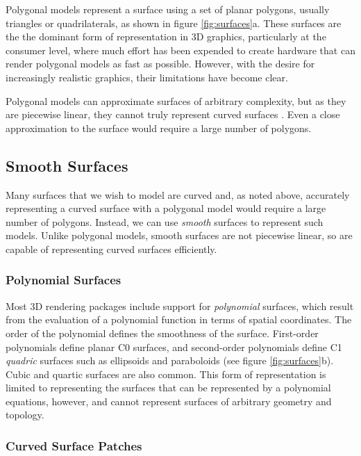 Polygonal models represent a surface using a set of planar polygons, usually triangles or quadrilaterals, as shown in figure \ref{fig:surfaces}a. These surfaces are the the dominant form of representation in 3D graphics, particularly at the consumer level, where much effort has been expended to create hardware that can render polygonal models as fast as possible. However, with the desire for increasingly realistic graphics, their limitations have become clear.

Polygonal models can approximate surfaces of arbitrary complexity, but as they are piecewise linear, they cannot truly represent curved surfaces \cite{Besl94}. Even a close approximation to the surface would require a large number of polygons.

\subsection{\label{sec:litreview:surfaces:smooth}Smooth Surfaces}

Many surfaces that we wish to model are curved and, as noted above, accurately representing a curved surface with a polygonal model would require a large number of polygons. Instead, we can use {\it smooth} surfaces to represent such models. Unlike polygonal models, smooth surfaces are not piecewise linear, so are capable of representing curved surfaces efficiently.

\subsubsection{\label{sec:litreview:surfaces:smooth:polynomial}Polynomial Surfaces}

Most 3D rendering packages include support for {\it polynomial} surfaces, which result from the evaluation of a polynomial function in terms of spatial coordinates. The order of the polynomial defines the smoothness of the surface. First-order polynomials define planar C0 surfaces, and second-order polynomials define C1 {\it quadric} surfaces such as ellipsoids and paraboloids (see figure \ref{fig:surfaces}b). Cubic and quartic surfaces are also common. This form of representation is limited to representing the surfaces that can be represented by a polynomial equations, however, and cannot represent surfaces of arbitrary geometry and topology.

\subsubsection{\label{sec:litreview:surfaces:smooth:curved}Curved Surface Patches}

